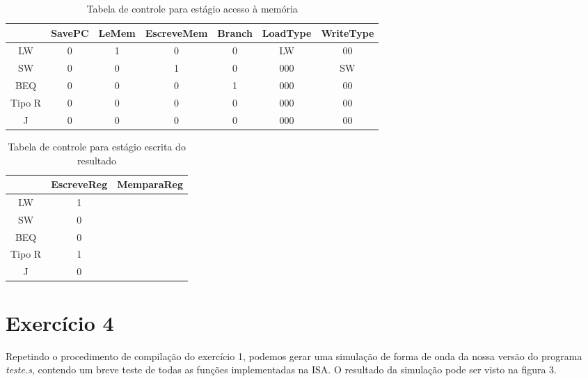 \documentclass[12pt, a4paper, twoside]{article}
\begin{document}
\begin{table}[H]
    \centering
    \begin{tabular}{|ccccccc|}
    \hline
      & SavePC & LeMem & EscreveMem & Branch & LoadType & WriteType\\
    \hline
     LW     & 0 & 1 & 0 & 0 & LW & 00 \\
     SW     & 0 & 0 & 1 & 0 & 000 & SW \\
     BEQ    & 0 & 0 & 0 & 1 & 000 & 00 \\
     Tipo R & 0 & 0 & 0 & 0 & 000 & 00 \\
     J      & 0 & 0 & 0 & 0 & 000 & 00 \\

    \hline
    \end{tabular}
    \caption{Tabela de controle para estágio acesso à memória}
\end{table}

\begin{table}[H]
    \centering
    \begin{tabular}{|ccc|}
    \hline
      & EscreveReg & MemparaReg \\
    \hline
    LW      & 1 & \\
    SW      & 0 & \\
    BEQ     & 0 & \\
    Tipo R  & 1 & \\
    J       & 0 & \\
    \hline
    \end{tabular}
    \caption{Tabela de controle para estágio escrita do resultado}
\end{table}

%

\section{Exercício 4}

Repetindo o procedimento de compilação do exercício 1, podemos gerar uma simulação de forma de onda da nossa versão do programa \textit{teste.s}, contendo um breve teste de todas as funções implementadas na ISA. O resultado da simulação pode ser visto na figura 3.
\end{document}
